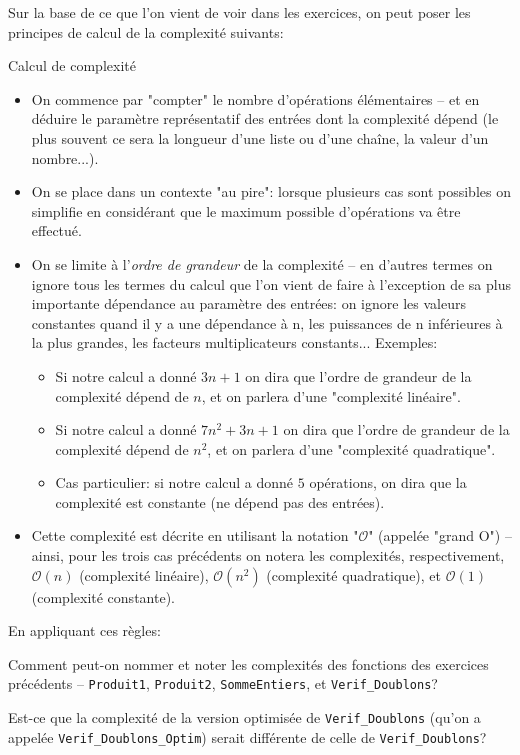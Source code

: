 \documentclass[12pt]{article}
\begin{document}
	Sur la base de ce que l'on vient de voir dans les exercices, on peut poser les principes de calcul de la complexité suivants:
	\begin{MaRgl}{Calcul de complexité}
		\begin{itemize}
			\item On commence par "compter" le nombre d'opérations élémentaires -- et en déduire le paramètre représentatif des entrées dont la complexité dépend (le plus souvent ce sera la longueur d'une liste ou d'une chaîne, la valeur d'un nombre...).
			\item On se place dans un contexte "au pire": lorsque plusieurs cas sont possibles on simplifie en considérant que le maximum possible d'opérations va être effectué.
			\item On se limite à l'\textit{ordre de grandeur} de la complexité -- en d'autres termes on ignore tous les termes du calcul que l'on vient de faire à l'exception de sa plus importante dépendance au paramètre des entrées: on ignore les valeurs constantes quand il y a une dépendance à n, les puissances de n inférieures à la plus grandes, les facteurs multiplicateurs constants... Exemples:
			\begin{itemize}
				\item Si notre calcul a donné $3n + 1$ on dira que l'ordre de grandeur de la complexité dépend de $n$, et on parlera d'une "complexité linéaire".
				\item Si notre calcul a donné $7n^2 + 3n + 1$ on dira que l'ordre de grandeur de la complexité dépend de $n^2$, et on parlera d'une "complexité quadratique".
				\item Cas particulier: si notre calcul a donné $5$ opérations, on dira que la complexité est constante (ne dépend pas des entrées).
			\end{itemize}
			\item Cette complexité est décrite en utilisant la notation "$\mathcal{O}$" (appelée "grand O") -- ainsi, pour les trois cas précédents on notera les complexités, respectivement, $\mathcal{O}(n)$ (complexité linéaire), $\mathcal{O}(n^2)$ (complexité quadratique), et $\mathcal{O}(1)$ (complexité constante).
		\end{itemize}
	\end{MaRgl}
	
	\begin{MonExo}
		En appliquant ces règles:
		\begin{alphenum}
			\item Comment peut-on nommer et noter les complexités des fonctions des exercices précédents -- \texttt{Produit1}, \texttt{Produit2}, \texttt{SommeEntiers}, et \texttt{Verif\_Doublons}?
			\item Est-ce que la complexité de la version optimisée de \texttt{Verif\_Doublons} (qu'on a appelée \texttt{Verif\_Doublons\_Optim}) serait différente de celle de \texttt{Verif\_Doublons}?
		\end{alphenum}
	\end{MonExo}
	
\end{document}
